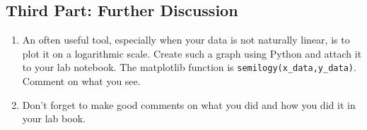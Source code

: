 \documentclass[twoside,11pt,ShortChapTitles]{BYUTextbook}
\begin{document}
\subsection{Third Part: Further Discussion}

\begin{enumerate}
\item An often useful tool, especially when your data is not naturally linear,
is to plot it on a logarithmic scale. Create such a graph using Python and attach it to your lab notebook.  The matplotlib function is \texttt{semilogy(x\_data,y\_data)}. Comment on what you see.

\item Don't forget to make good comments on what you did and how you did it in
your lab book.
\end{enumerate}
\end{document}
